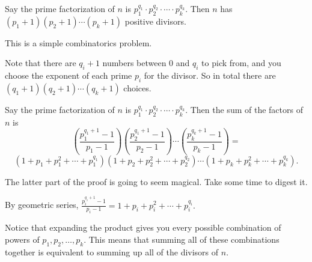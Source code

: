 \documentclass[mast]{lucky}
\begin{document}
\begin{theo}
Say the prime factorization of $n$ is $p_1^{q_1}\cdot p_2^{q_2}\cdot\cdots\cdot p_k^{q_k}.$ Then $n$ has $(p_1+1)(p_2+1)\cdots(p_k+1)$ positive divisors.
\end{theo}

\begin{pro}
This is a simple combinatorics problem.

Note that there are $q_i+1$ numbers between $0$ and $q_i$ to pick from, and you choose the exponent of each prime $p_i$ for the divisor. So in total there are $(q_1+1)(q_2+1)\cdots(q_k+1)$ choices.
\end{pro}

\begin{theo}
Say the prime factorization of $n$ is $p_1^{q_1}\cdot p_2^{q_2}\cdot\cdots\cdot p_k^{q_k}.$ Then the sum of the factors of $n$ is
\[\left(\frac{p_1^{q_1+1}-1}{p_1-1}\right)\left(\frac{p_2^{q_1+1}-1}{p_2-1}\right)\cdots\left(\frac{p_k^{q_k+1}-1}{p_k-1}\right)=\]
\[\left(1+p_1+p_1^2+\cdots+p_1^{q_1}\right)\left(1+p_2+p_2^2+\cdots+p_2^{q_2}\right)\cdots\left(1+p_k+p_k^2+\cdots+p_k^{q_k}\right).\]
\end{theo}
The latter part of the proof is going to seem magical. Take some time to digest it.

\begin{pro}
By geometric series, $\frac{p_i^{q_i+1}-1}{p_i-1}=1+p_i+p_i^2+\cdots+p_i^{q_i}.$

Notice that expanding the product gives you every possible combination of powers of $p_1,p_2,\ldots,p_k.$ This means that summing all of these combinations together is equivalent to summing up all of the divisors of $n.$
\end{pro}
\end{document}

